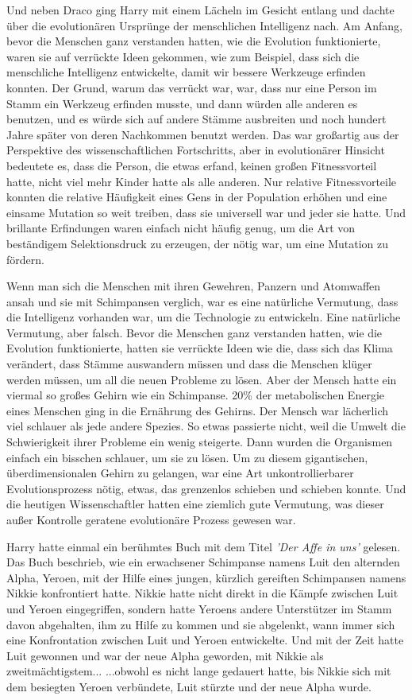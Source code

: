 Und neben Draco ging Harry mit einem Lächeln im Gesicht entlang und dachte über
die evolutionären Ursprünge der menschlichen Intelligenz nach. Am Anfang, bevor
die Menschen ganz verstanden hatten, wie die Evolution funktionierte, waren sie
auf verrückte Ideen gekommen, wie zum Beispiel, dass sich die menschliche
Intelligenz entwickelte, damit wir bessere Werkzeuge erfinden konnten. Der
Grund, warum das verrückt war, war, dass nur eine Person im Stamm ein Werkzeug
erfinden musste, und dann würden alle anderen es benutzen, und es würde sich auf
andere Stämme ausbreiten und noch hundert Jahre später von deren Nachkommen
benutzt werden. Das war großartig aus der Perspektive des wissenschaftlichen
Fortschritts, aber in evolutionärer Hinsicht bedeutete es, dass die Person, die
etwas erfand, keinen großen Fitnessvorteil hatte, nicht viel mehr Kinder hatte
als alle anderen. Nur relative Fitnessvorteile konnten die relative Häufigkeit
eines Gens in der Population erhöhen und eine einsame Mutation so weit treiben,
dass sie universell war und jeder sie hatte. Und brillante Erfindungen waren
einfach nicht häufig genug, um die Art von beständigem Selektionsdruck zu
erzeugen, der nötig war, um eine Mutation zu fördern.

Wenn man sich die Menschen mit ihren Gewehren, Panzern und Atomwaffen ansah und
sie mit Schimpansen verglich, war es eine natürliche Vermutung, dass die
Intelligenz vorhanden war, um die Technologie zu entwickeln. Eine natürliche
Vermutung, aber falsch. Bevor die Menschen ganz verstanden hatten, wie die
Evolution funktionierte, hatten sie verrückte Ideen wie die, dass sich das Klima
verändert, dass Stämme auswandern müssen und dass die Menschen klüger werden
müssen, um all die neuen Probleme zu lösen. Aber der Mensch hatte ein viermal so
großes Gehirn wie ein Schimpanse. 20\% der metabolischen Energie eines Menschen
ging in die Ernährung des Gehirns. Der Mensch war lächerlich viel schlauer als
jede andere Spezies. So etwas passierte nicht, weil die Umwelt die Schwierigkeit
ihrer Probleme ein wenig steigerte. Dann wurden die Organismen einfach ein
bisschen schlauer, um sie zu lösen. Um zu diesem gigantischen, überdimensionalen
Gehirn zu gelangen, war eine Art unkontrollierbarer Evolutionsprozess nötig,
etwas, das grenzenlos schieben und schieben konnte. Und die heutigen
Wissenschaftler hatten eine ziemlich gute Vermutung, was dieser außer Kontrolle
geratene evolutionäre Prozess gewesen war.

Harry hatte einmal ein berühmtes Buch mit dem Titel \emph{'Der Affe in uns'
}gelesen. Das Buch beschrieb, wie ein erwachsener Schimpanse namens Luit den
alternden Alpha, Yeroen, mit der Hilfe eines jungen, kürzlich gereiften
Schimpansen namens Nikkie konfrontiert hatte. Nikkie hatte nicht direkt in die
Kämpfe zwischen Luit und Yeroen eingegriffen, sondern hatte Yeroens andere
Unterstützer im Stamm davon abgehalten, ihm zu Hilfe zu kommen und sie
abgelenkt, wann immer sich eine Konfrontation zwischen Luit und Yeroen
entwickelte. Und mit der Zeit hatte Luit gewonnen und war der neue Alpha
geworden, mit Nikkie als zweitmächtigstem... ...obwohl es nicht lange gedauert
hatte, bis Nikkie sich mit dem besiegten Yeroen verbündete, Luit stürzte und der
neue Alpha wurde.

